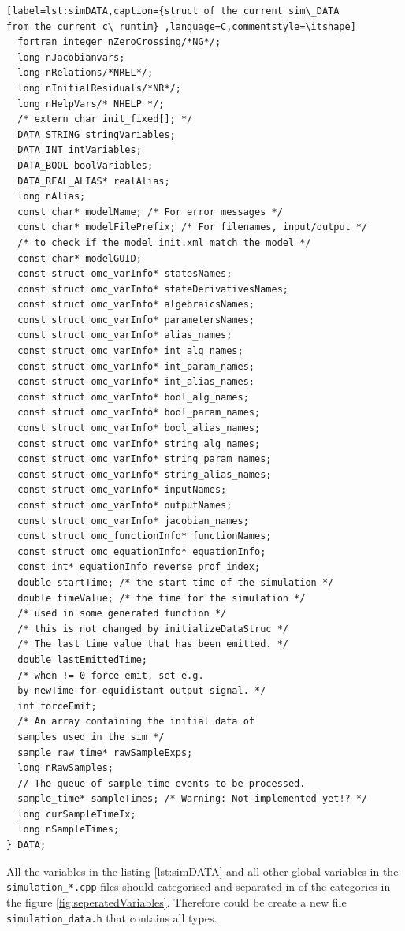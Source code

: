 \begin{lstlisting}[label=lst:simDATA,caption={struct of the current sim\_DATA
from the current c\_runtim} ,language=C,commentstyle=\itshape]
  fortran_integer nZeroCrossing/*NG*/;
  long nJacobianvars;
  long nRelations/*NREL*/;
  long nInitialResiduals/*NR*/;
  long nHelpVars/* NHELP */;
  /* extern char init_fixed[]; */
  DATA_STRING stringVariables;
  DATA_INT intVariables;
  DATA_BOOL boolVariables;
  DATA_REAL_ALIAS* realAlias;
  long nAlias;
  const char* modelName; /* For error messages */
  const char* modelFilePrefix; /* For filenames, input/output */
  /* to check if the model_init.xml match the model */
  const char* modelGUID; 
  const struct omc_varInfo* statesNames;
  const struct omc_varInfo* stateDerivativesNames;
  const struct omc_varInfo* algebraicsNames;
  const struct omc_varInfo* parametersNames;
  const struct omc_varInfo* alias_names;
  const struct omc_varInfo* int_alg_names;
  const struct omc_varInfo* int_param_names;
  const struct omc_varInfo* int_alias_names;
  const struct omc_varInfo* bool_alg_names;
  const struct omc_varInfo* bool_param_names;
  const struct omc_varInfo* bool_alias_names;
  const struct omc_varInfo* string_alg_names;
  const struct omc_varInfo* string_param_names;
  const struct omc_varInfo* string_alias_names;
  const struct omc_varInfo* inputNames;
  const struct omc_varInfo* outputNames;
  const struct omc_varInfo* jacobian_names;
  const struct omc_functionInfo* functionNames;
  const struct omc_equationInfo* equationInfo;
  const int* equationInfo_reverse_prof_index;
  double startTime; /* the start time of the simulation */
  double timeValue; /* the time for the simulation */
  /* used in some generated function */
  /* this is not changed by initializeDataStruc */
  /* The last time value that has been emitted. */
  double lastEmittedTime; 
  /* when != 0 force emit, set e.g. 
  by newTime for equidistant output signal. */
  int forceEmit; 
  /* An array containing the initial data of 
  samples used in the sim */
  sample_raw_time* rawSampleExps;
  long nRawSamples;
  // The queue of sample time events to be processed.
  sample_time* sampleTimes; /* Warning: Not implemented yet!? */
  long curSampleTimeIx;
  long nSampleTimes;
} DATA;
\end{lstlisting}

All the variables in the listing \ref{lst:simDATA} and all other global
variables in the \verb+simulation_*.cpp+ files should categorised and separated
in of the categories in the figure \ref{fig:seperatedVariables}.
Therefore could be create a new file \verb+simulation_data.h+ that contains all
types. 
$~~$\\


